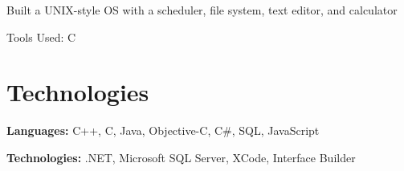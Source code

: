 \documentclass{resume}
\begin{document}
        \vspace{0.10 cm}
        \begin{onecolentry}
            \begin{highlights}
                \item Built a UNIX-style OS with a scheduler, file system, text editor, and calculator
                \item Tools Used: C
            \end{highlights}
        \end{onecolentry}



    
    \section{Technologies}



        
        \begin{onecolentry}
            \textbf{Languages:} C++, C, Java, Objective-C, C\#, SQL, JavaScript
        \end{onecolentry}

        \vspace{0.2 cm}

        \begin{onecolentry}
            \textbf{Technologies:} .NET, Microsoft SQL Server, XCode, Interface Builder
        \end{onecolentry}


    
\end{document}
